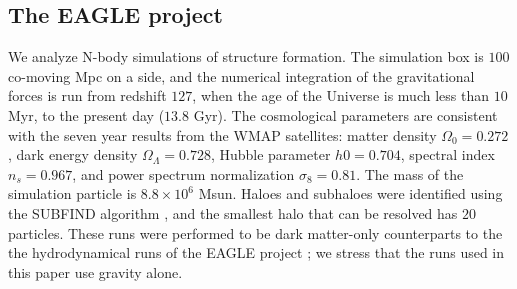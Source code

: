\documentclass[12pt]{article}
\begin{document}
\subsection{The EAGLE project}
We analyze N-body simulations of structure formation. The simulation box is $100$ co-moving Mpc on a side, and the numerical integration of the gravitational forces is run from redshift $127$, when the age of the Universe is much less than $10$ Myr,  to the present day ($13.8$ Gyr). The cosmological parameters are consistent with the seven year results from the WMAP satellites: matter density $\Omega_0 = 0.272$, dark energy density $\Omega_{\Lambda} = 0.728$, Hubble parameter $h0 = 0.704$, spectral index $n_{s}=0.967$, and power spectrum normalization $\sigma_8=0.81$. The mass of the simulation particle is $8.8 \times 10^{6}$ Msun. Haloes and subhaloes were identified using the SUBFIND algorithm \cite{springel2001populating}, and the smallest halo that can be resolved has $20$ particles. These runs were performed to be dark matter-only counterparts to the the hydrodynamical runs of the EAGLE project \cite{schaye2015eagle}; we stress that the runs used in this paper use gravity alone. 
\end{document}
